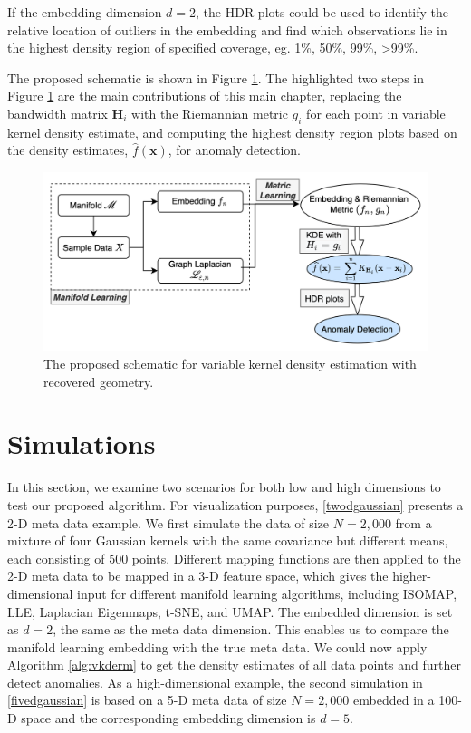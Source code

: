 \documentclass[11pt,a4paper,]{article}
\begin{document}
If the embedding dimension \(d=2\), the HDR plots \autocite{Hyndman1996-lk} could be used to identify the relative location of outliers in the embedding and find which observations lie in the highest density region of specified coverage, eg. 1\%, 50\%, 99\%, \textgreater99\%.

The proposed schematic is shown in Figure \ref{fig:vkde}. The highlighted two steps in Figure \ref{fig:vkde} are the main contributions of this main chapter, replacing the bandwidth matrix \(\pmb{H}_i\) with the Riemannian metric \(g_i\) for each point in
variable kernel density estimate, and computing the highest density region plots based on the density estimates, \(\hat{f}(\pmb{x})\), for anomaly detection.



\begin{figure}

{\centering \includegraphics[width=0.95\linewidth]{figures/vkde} 

}

\caption{The proposed schematic for variable kernel density estimation with recovered geometry.}\label{fig:vkde}
\end{figure}

\hypertarget{simulation}{%
\section{Simulations}\label{simulation}}

In this section, we examine two scenarios for both low and high dimensions to test our proposed algorithm. For visualization purposes, \autoref{twodgaussian} presents a 2-D meta data example. We first simulate the data of size \(N=2,000\) from a mixture of four Gaussian kernels with the same covariance but different means, each consisting of \(500\) points. Different mapping functions are then applied to the 2-D meta data to be mapped in a 3-D feature space, which gives the higher-dimensional input for different manifold learning algorithms, including ISOMAP, LLE, Laplacian Eigenmaps, t-SNE, and UMAP. The embedded dimension is set as \(d=2\), the same as the meta data dimension.
This enables us to compare the manifold learning embedding with the true meta data. We could now apply Algorithm \ref{alg:vkderm} to get the density estimates of all data points and further detect anomalies. As a high-dimensional example, the second simulation in \autoref{fivedgaussian} is based on a 5-D meta data of size \(N=2,000\) embedded in a 100-D space and the corresponding embedding dimension is \(d=5\).
\end{document}
